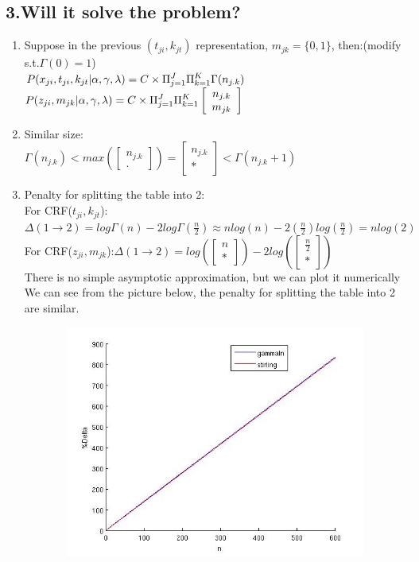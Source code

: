 \documentclass{article}
\begin{document}
\begin{spacing}{1.1}
{\section{3.Will it solve the problem?}
\begin{enumerate}
 \item Suppose in the previous $(t_{ji},k_{jt})$ representation, $m_{jk}=\{0,1\}$, then:(modify s.t.$\Gamma(0)=1$)\\
$P(x_{ji},t_{ji},k_{jt}|\alpha,\gamma,\lambda)=C\times\displaystyle \Pi_{j=1}^{J} \displaystyle \Pi_{k=1}^{K}\Gamma(n_{j.k})\\$
$P(z_{ji},m_{jk}|\alpha,\gamma,\lambda)=C\times\displaystyle \Pi_{j=1}^{J} \displaystyle \Pi_{k=1}^{K}\left[ \begin{array}{c}
n_{j.k} \\
m_{jk} \end{array} \right] \\$
 \item Similar size:\\$ \Gamma(n_{j.k})<max(\left[ \begin{array}{c} n_{j.k} \\. \end{array} \right])=\left[ \begin{array}{c} n_{j.k} \\ * \end{array} \right]<\Gamma(n_{j.k}+1)$
 \item Penalty for splitting the table into 2:\\
For CRF($t_{ji},k_{jt}$):$\Delta(1\rightarrow2)=log\Gamma(n)-2log\Gamma(\frac{n}{2})\approx nlog(n)-2(\frac{n}{2})log(\frac{n}{2})=nlog(2)$\\
For CRF($z_{ji},m_{jk}$):$\Delta(1\rightarrow2)= log(\left[ \begin{array}{c} n \\ * \end{array} \right])-2log(\left[ \begin{array}{c} \frac{n}{2} \\ * \end{array} \right])$
\\There is no simple asymptotic approximation, but we can plot it numerically\\
We can see from the picture below, the penalty for splitting the table into 2 are similar.
\begin{center}
\includegraphics[width=5in,height=3in]{com.jpg} 

\end{center}
\end{enumerate}}
\end{spacing}
\end{document}
